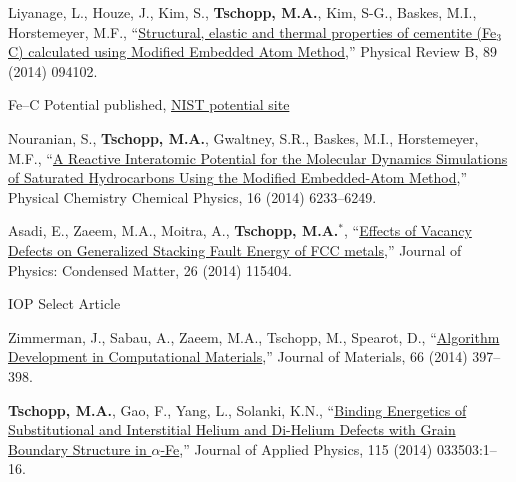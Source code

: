 \begin{cvlist}
\item
{Liyanage, L.}, Houze, J., Kim, S., \textbf{Tschopp, M.A.}, Kim, S-G., Baskes, M.I., Horstemeyer, M.F., ``\href{http://dx.doi.org/10.1103/PhysRevB.89.094102}{Structural, elastic and thermal properties of cementite (Fe$_3$C) calculated using Modified Embedded Atom Method},'' Physical Review B, 89 (2014) 094102.
\begin{list2}
\item[$\star$] Fe--C Potential published, \href{http://www.ctcms.nist.gov/potentials/Fe-C.html}{NIST potential site}
\end{list2}

\item
{Nouranian, S.}, \textbf{Tschopp, M.A.}, Gwaltney, S.R., Baskes, M.I.,  Horstemeyer, M.F., ``\href{http://dx.doi.org/10.1039/c4cp00027g}{A Reactive Interatomic Potential for the Molecular Dynamics Simulations of Saturated Hydrocarbons Using the Modified Embedded-Atom Method},'' Physical Chemistry Chemical Physics, 16 (2014) 6233--6249.

\item
{Asadi, E.}, Zaeem, M.A., Moitra, A., \textbf{Tschopp, M.A.}$^\ast$, ``\href{http://dx.doi.org/10.1088/0953-8984/26/11/115404}{Effects of Vacancy Defects on Generalized Stacking Fault Energy of FCC metals},'' Journal of Physics: Condensed Matter, 26 (2014) 115404.
\begin{list2}
\item[$\star$] IOP Select Article
\end{list2}

\item
Zimmerman, J., Sabau, A., Zaeem, M.A., Tschopp, M., Spearot, D., ``\href{http://dx.doi.org/10.1007/s11837-013-0846-2}{Algorithm Development in Computational Materials},'' Journal of Materials, 66 (2014) 397--398.

\item
\textbf{Tschopp, M.A.}, Gao, F., Yang, L., Solanki, K.N., ``\href{http://dx.doi.org/10.1063/1.4861719}{Binding Energetics of Substitutional and Interstitial Helium and Di-Helium Defects with Grain Boundary Structure in $\alpha$-Fe},'' Journal of Applied Physics, 115 (2014) 033503:1--16.


\end{cvlist}
